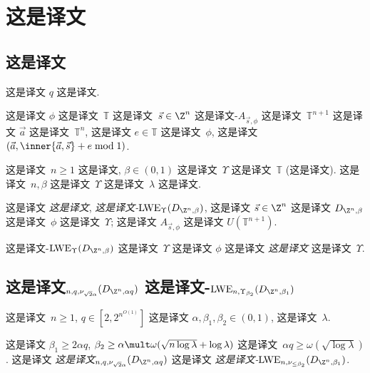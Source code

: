 \section{这是译文}


\subsection{这是译文}

这是译文 $q$ 这是译文.

这是译文 $\phi$ 这是译文~$\mathbb{T}$ 这是译文~$\vec{s} \in \Z^n$ 这是译文-$A_{\vec{s},\phi}$ 这是译文~$\mathbb{T}^{n+1}$ 这是译文 $\vec{a}$ 这是译文~$\mathbb{T}^{n}$, 这是译文 $e \in \mathbb{T}$ 这是译文~$\phi$, 这是译文~$(\vec{a}, \inner{\vec{a},\vec{s}}+ e \bmod 1)$.

\begin{definition}
  这是译文~$n \geq 1$ 这是译文, $\beta \in (0,1)$ 这是译文~$\Upsilon$ 这是译文~$\mathbb{T}$ (这是译文). 这是译文~$n, \beta$ 这是译文~$\Upsilon$ 这是译文~$\lambda$ 这是译文. 
  
  这是译文 \emph{这是译文}, \emph{这是译文-$\text{LWE}_{\Upsilon}(D_{\Z^n, \beta})$}, 这是译文 $\vec{s} \in \Z^n$ 这是译文 $D_{\Z^n, \beta}$ 这是译文~$\phi$ 这是译文~$\Upsilon$; 这是译文 $A_{\vec{s},\phi}$ 这是译文 $U( \mathbb{T}^{n+1})$.
\end{definition}

这是译文-$\text{LWE}_{\Upsilon}(D_{\Z^n, \beta})$ 这是译文~$\Upsilon$ 这是译文 $\phi$ 这是译文 \emph{这是译文} 这是译文~$\Upsilon$.


\subsection{这是译文$_{n,q,\nu_{\sqrt{2}\alpha}}(D_{\Z^n, \alpha q})$ 这是译文-$\text{LWE}_{n,\Upsilon_{\beta_2}}(D_{\Z^n, \beta_1})$}


\begin{theorem}\label{th:real}  这是译文~$n \geq 1$, $q \in [2, 2^{n^{O(1)}}]$ 这是译文 $\alpha, \beta_1, \beta_2
  \in (0,1)$, 这是译文~$\lambda$.
  
  这是译文 $\beta_1 \geq 2 \alpha q $,  $\beta_2 \geq \alpha \mult \omega(\sqrt{n \log \lambda} + \log \lambda)$ 这是译文~$\alpha q \geq \omega(\sqrt{\log \lambda})$.  这是译文 \emph{这是译文$_{n,q,\nu_{\sqrt{2}\alpha}}(D_{\Z^n, \alpha q})$}  这是译文 \emph{这是译文-$\text{LWE}_{n,\nu_{\leq \beta_2}}(D_{\Z^n, \beta_1})$}.
\end{theorem}

